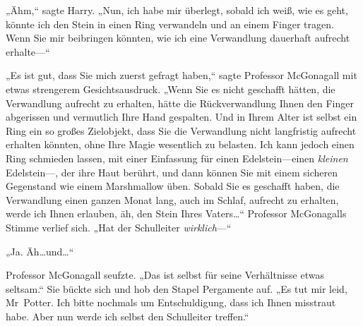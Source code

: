 „Ähm,“ sagte Harry. „Nun, ich habe mir überlegt, sobald ich weiß, wie es geht, könnte ich den Stein in einen Ring verwandeln und an einem Finger tragen. Wenn Sie mir beibringen könnten, wie ich eine Verwandlung dauerhaft aufrecht erhalte—“

„Es ist gut, dass Sie mich zuerst gefragt haben,“ sagte Professor McGonagall mit etwas strengerem Gesichtsausdruck. „Wenn Sie es nicht geschafft hätten, die Verwandlung aufrecht zu erhalten, hätte die Rückverwandlung Ihnen den Finger abgerissen und vermutlich Ihre Hand gespalten. Und in Ihrem Alter ist selbst ein Ring ein so großes Zielobjekt, dass Sie die Verwandlung nicht langfristig aufrecht erhalten könnten, ohne Ihre Magie wesentlich zu belasten. Ich kann jedoch einen Ring schmieden lassen, mit einer Einfassung für einen Edelstein—einen \emph{kleinen} Edelstein—, der ihre Haut berührt, und dann können Sie mit einem sicheren Gegenstand wie einem Marshmallow üben. Sobald Sie es geschafft haben, die Verwandlung einen ganzen Monat lang, auch im Schlaf, aufrecht zu erhalten, werde ich Ihnen erlauben, äh, den Stein Ihres Vaters…“ Professor McGonagalls Stimme verlief sich. „Hat der Schulleiter \emph{wirklich}—“

„Ja. Äh…und…“

Professor McGonagall seufzte. „Das ist selbst für seine Verhältnisse etwas seltsam.“ Sie bückte sich und hob den Stapel Pergamente auf. „Es tut mir leid, Mr~Potter. Ich bitte nochmals um Entschuldigung, dass ich Ihnen misstraut habe. Aber nun werde ich selbst den Schulleiter treffen.“

